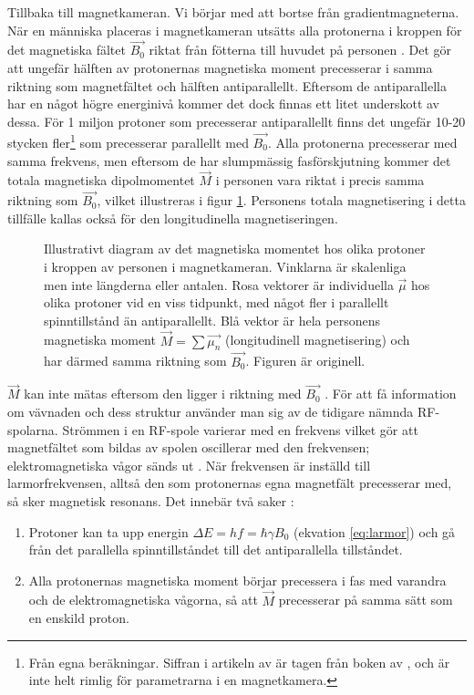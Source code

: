 \documentclass[11pt, a4paper]{article}
\begin{document}
Tillbaka till magnetkameran. Vi börjar med att bortse från gradientmagneterna. När en människa placeras i magnetkameran utsätts alla protonerna i kroppen för det magnetiska fältet $\vec{B_0}$ riktat från fötterna till huvudet på personen \parencite{understanding_mri}. Det gör att ungefär hälften av protonernas magnetiska moment precesserar i samma riktning som magnetfältet och hälften antiparallellt. Eftersom de antiparallella har en något högre energinivå kommer det dock finnas ett litet underskott av dessa. För 1 miljon protoner som precesserar antiparallellt finns det ungefär 10-20 stycken fler\footnote{Från egna beräkningar. Siffran i artikeln av \textcite{understanding_mri} är tagen från boken  av \textcite{mri_made_easy}, och är inte helt rimlig för parametrarna i en magnetkamera.} som precesserar parallellt med $\vec{B_0}$. Alla protonerna precesserar med samma frekvens, men eftersom de har slumpmässig fasförskjutning kommer det totala magnetiska dipolmomentet $\vec{M}$ i personen vara riktat i precis samma riktning som $\vec{B_0}$, vilket illustreras i figur \ref{fig:spinn_vektorer}. Personens totala magnetisering i detta tillfälle kallas också för den longitudinella magnetiseringen.

\begin{figure}[ht]
	\centering
	
	\caption{Illustrativt diagram av det magnetiska momentet hos olika protoner i kroppen av personen i magnetkameran. Vinklarna är skalenliga men inte längderna eller antalen. Rosa vektorer är individuella $\vec{\mu}$ hos olika protoner vid en viss tidpunkt, med något fler i parallellt spinntillstånd än antiparallellt. Blå vektor är hela personens magnetiska moment $\vec{M}=\sum{\vec{\mu_n}}$ (longitudinell magnetisering) och har därmed samma riktning som $\vec{B_0}$. Figuren är originell.}
	\label{fig:spinn_vektorer}
\end{figure}

$\vec{M}$ kan inte mätas eftersom den ligger i riktning med $\vec{B_0}$ \parencite{understanding_mri}. För att få information om vävnaden och dess struktur använder man sig av de tidigare nämnda RF-spolarna. Strömmen i en RF-spole varierar med en frekvens vilket gör att magnetfältet som bildas av spolen oscillerar med den frekvensen; elektromagnetiska vågor sänds ut \parencite{mri_for_radiologists}. När frekvensen är inställd till larmorfrekvensen, alltså den som protonernas egna magnetfält precesserar med, så sker magnetisk resonans. Det innebär två saker \parencite{understanding_mri}:
\begin{enumerate}
	\item Protoner kan ta upp energin $\Delta E=hf=\hbar\gamma B_0$ (ekvation \ref{eq:larmor}) och gå från det parallella spinntillståndet till det antiparallella tillståndet.
	\item Alla protonernas magnetiska moment börjar precessera i fas med varandra och de elektromagnetiska vågorna, så att $\vec{M}$ precesserar på samma sätt som en enskild proton.
\end{enumerate}
\end{document}
